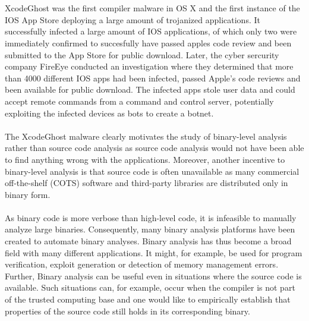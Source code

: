 \documentclass{kththesis}
\begin{document}
\\ \\
XcodeGhost was the first compiler malware in OS X and the first instance of the IOS App Store deploying a large amount of trojanized applications\cite{XcodeGhost}\cite{XcodeGhostFireEye}. It successfully infected a large amount of IOS applications, of which only two were immediately confirmed to succesfully have passed apples code review and been submitted to the App Store for public download\cite{XcodeGhost}. Later, the cyber sercurity company FireEye conducted an investigation where they determined that more than 4000 different IOS apps had been infected, passed Apple's code reviews and been available for public download. The infected apps stole user data and could accept remote commands from a command and control server\cite{XcodeGhostFireEye}, potentially exploiting the infected devices as bots to create a botnet.
\\ \\
The XcodeGhost malware clearly motivates the study of binary-level analysis rather than source code analysis as source code analysis would not have been able to find anything wrong with the applications. Moreover, another incentive to binary-level analysis is that source code is often unavailable as many commercial off-the-shelf (COTS) software and third-party libraries are distributed only in binary form\cite{preciseCFG}.
\\ \\
As binary code is more verbose than high-level code, it is infeasible to manually analyze large binaries. Consequently, many binary analysis platforms have been created to automate binary analyses\cite{BitBlaze}\cite{BAP}\cite{TrABin}\cite{CodeSurfer}. Binary analysis has thus become a broad field with many different applications. It might, for example, be used for program verification\cite{TrABin}, exploit generation\cite{angr} or detection of memory management errors\cite{valgrind}. Further, Binary analysis can be useful even in situations where the source code is available. Such situations can, for example, occur when the compiler is not part of the trusted computing base and one would like to empirically establish that properties of the source code still holds in its corresponding binary.
\end{document}
